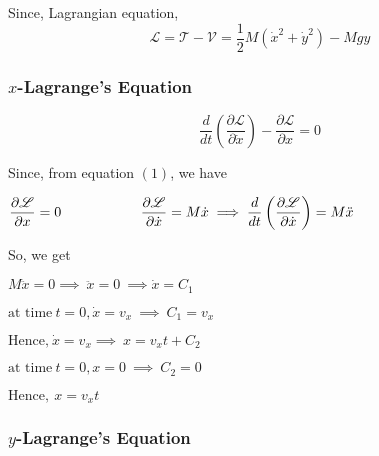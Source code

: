 \documentclass[12pt, a4paper]{article} %
\begin{document}
Since, Lagrangian equation, 
\begin{equation}
    \mathscr{L} = \mathcal{T - V} = \frac{1}{2}M\left(\dot{x}^2 + \dot{y}^2\right)-Mgy 
\end{equation}

\subsubsection*{$\displaystyle x$-Lagrange's Equation}

\begin{equation*}
    \frac{d}{dt}\left(\frac{\partial \mathscr{L}}{\partial \dot{x}}\right) - \frac{\partial \mathscr{L}}{\partial x} = 0
\end{equation*}

Since, from equation $(1)$, we have


\begin{center}
    $\displaystyle \frac{\partial \mathscr{L}}{\partial x} = 0 \hspace*{2cm} \frac{\partial \mathscr{L}}{\partial \dot{x}} = M\dot{x} \implies \frac{d}{dt}\left(\frac{\partial \mathscr{L}}{\partial \dot{x}}\right) = M\ddot{x}$
\end{center}

So, we get 

\begin{center}
    $M\ddot{x} = 0 \implies\ \ddot{x} = 0\ \implies \dot{x} = C_1$
\end{center}

\newpage

\BgThispage

\begin{center}
    $\displaystyle \mbox{at time}\ t=0, \dot{x} = v_x \ \implies\ C_1 = v_x$
\end{center}

\begin{center}
    $\displaystyle \mbox{Hence,}\ \dot{x} = v_x \implies\ x = v_x t + C_2$
\end{center}

\begin{center}
    $\displaystyle \mbox{at time}\ t=0, x = 0 \ \implies\ C_2 = 0$
\end{center}

\begin{center}
    $\mbox{Hence},\ \boxed{x = v_x t}$
\end{center}


\subsubsection*{$\displaystyle y$-Lagrange's Equation}
\end{document}
